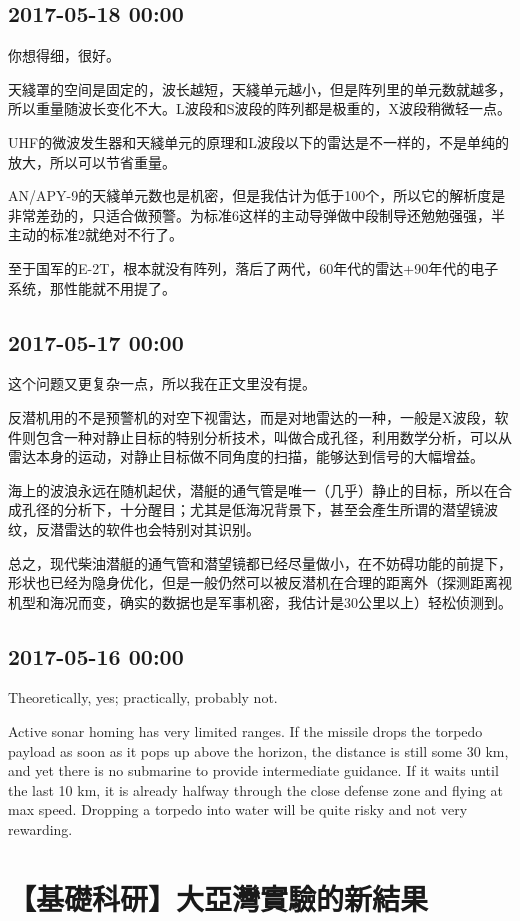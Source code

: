 \documentclass[twocolumn]{ctexart}
\begin{document}
\subsection*{2017-05-18 00:00}
你想得细，很好。

天綫罩的空间是固定的，波长越短，天綫单元越小，但是阵列里的单元数就越多，所以重量随波长变化不大。L波段和S波段的阵列都是极重的，X波段稍微轻一点。

UHF的微波发生器和天綫单元的原理和L波段以下的雷达是不一样的，不是单纯的放大，所以可以节省重量。

AN/APY-9的天綫单元数也是机密，但是我估计为低于100个，所以它的解析度是非常差劲的，只适合做预警。为标准6这样的主动导弹做中段制导还勉勉强强，半主动的标准2就绝对不行了。

至于国军的E-2T，根本就没有阵列，落后了两代，60年代的雷达+90年代的电子系统，那性能就不用提了。\subsection*{2017-05-17 00:00}
这个问题又更复杂一点，所以我在正文里没有提。

反潜机用的不是预警机的对空下视雷达，而是对地雷达的一种，一般是X波段，软件则包含一种对静止目标的特别分析技术，叫做合成孔径，利用数学分析，可以从雷达本身的运动，对静止目标做不同角度的扫描，能够达到信号的大幅增益。

海上的波浪永远在随机起伏，潜艇的通气管是唯一（几乎）静止的目标，所以在合成孔径的分析下，十分醒目；尤其是低海况背景下，甚至会產生所谓的潜望镜波纹，反潜雷达的软件也会特别对其识别。

总之，现代柴油潜艇的通气管和潜望镜都已经尽量做小，在不妨碍功能的前提下，形状也已经为隐身优化，但是一般仍然可以被反潜机在合理的距离外（探测距离视机型和海况而变，确实的数据也是军事机密，我估计是30公里以上）轻松侦测到。\subsection*{2017-05-16 00:00}
Theoretically, yes; practically, probably not. 

Active sonar homing has very limited ranges. If the missile drops the torpedo payload as soon as it pops up above the horizon, the distance is still some 30 km, and yet there is no submarine to provide intermediate guidance. If it waits until the last 10 km, it is already halfway through the close defense zone and flying at max speed. Dropping a torpedo into water will be quite risky and not very rewarding.\section*{【基礎科研】大亞灣實驗的新結果}
\end{document}
